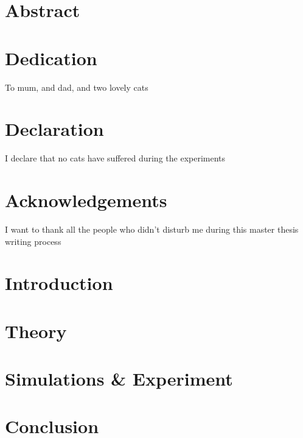 \documentclass[a4paper,11pt]{article}
\begin{document}
\newpage

\section*{Abstract}



\newpage

\section*{Dedication}
To mum, and dad, and two lovely cats

\section*{Declaration}
I declare that no cats have suffered during the experiments

\section*{Acknowledgements}
I want to thank all the people who didn't disturb me during this master thesis writing process

\newpage

\tableofcontents


\section{Introduction}


\section{Theory}


\section{Simulations \& Experiment}


\section{ }


\section{Conclusion}


\nocite{*}
\printbibliography[heading=bibintoc]

\begin{appendix}

\end{appendix}
\end{document}
